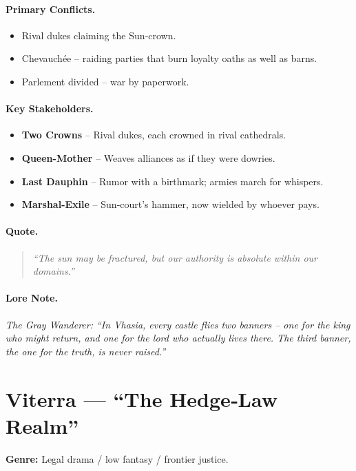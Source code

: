 \paragraph{Primary Conflicts.}
\begin{itemize}
  \item Rival dukes claiming the Sun‑crown.
  \item Chevauchée – raiding parties that burn loyalty oaths as well as barns.
  \item Parlement divided – war by paperwork.
\end{itemize}

\paragraph{Key Stakeholders.}
\begin{itemize}
  \item \textbf{Two Crowns} – Rival dukes, each crowned in rival cathedrals.
  \item \textbf{Queen-Mother} – Weaves alliances as if they were dowries.
  \item \textbf{Last Dauphin} – Rumor with a birthmark; armies march for whispers.
  \item \textbf{Marshal-Exile} – Sun‑court’s hammer, now wielded by whoever pays.
\end{itemize}

\paragraph{Quote.}
\begin{quote}
\emph{“The sun may be fractured, but our authority is absolute within our domains.”}
\end{quote}

\paragraph{Lore Note.}
\emph{The Gray Wanderer: “In Vhasia, every castle flies two banners – one for the king who might return, and one for the lord who actually lives there. The third banner, the one for the truth, is never raised.”}

\section{Viterra — “The Hedge‑Law Realm”}
\textbf{Genre:} Legal drama / low fantasy / frontier justice.

